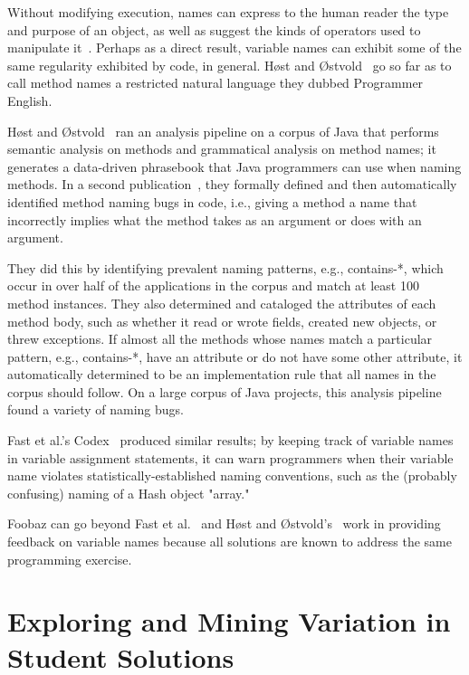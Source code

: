 Without modifying execution, names can express to the human reader the type and purpose of an object, as well as suggest the kinds of operators used to manipulate it~\cite{jones2008operand}. Perhaps as a direct result, variable names can exhibit some of the same regularity exhibited by code, in general. H{{\o{}}}st and {{\O{}}}stvold~\cite{host2008java} go so far as to call method names a restricted natural language they dubbed Programmer English.

H{{\o{}}}st and {{\O{}}}stvold~\cite{host2008java} ran an analysis pipeline on a corpus of Java that performs semantic analysis on methods and grammatical analysis on method names; it generates a data-driven phrasebook that Java programmers can use when naming methods. In a second publication~\cite{host2009debugging}, they formally defined and then automatically identified method naming bugs in code, i.e., giving a method a name that incorrectly implies what the method takes as an argument or does with an argument.

They did this by identifying prevalent naming patterns, e.g., contains-*, which occur in over half of the applications in the corpus and match at least 100 method instances. They also determined and cataloged the attributes of each method body, such as whether it read or wrote fields, created new objects, or threw exceptions. If almost all the methods whose names match a particular pattern, e.g., contains-*, have an attribute or do not have some other attribute, it automatically determined to be an implementation rule that all names in the corpus should follow. On a large corpus of Java projects, this analysis pipeline found a variety of naming bugs.

Fast et al.'s Codex~\cite{codex} produced similar results; by keeping track of variable names in variable assignment statements, it can warn programmers when their variable name violates statistically-established naming conventions, such as the (probably confusing) naming of a Hash object "array." 

Foobaz can go beyond Fast et al.~\cite{codex} and H{{\o{}}}st and {{\O{}}}stvold's~\cite{host2008java,host2009debugging} work in providing feedback on variable names because all solutions are known to address the same programming exercise.

\section{Exploring and Mining Variation in Student Solutions}

